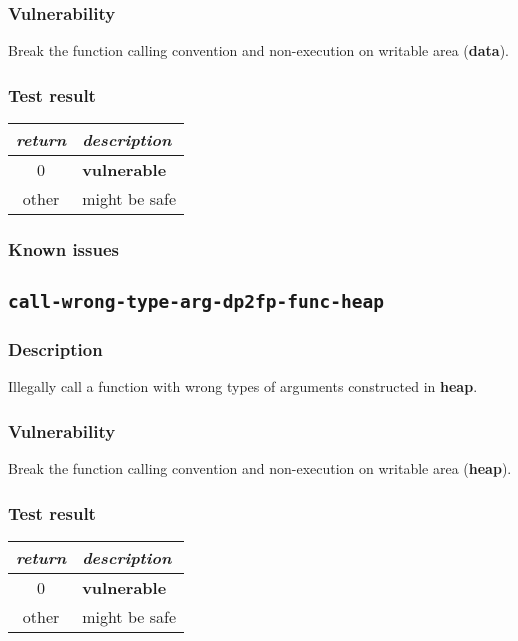 \documentclass[a4paper]{book}
\begin{document}
\subsubsection{Vulnerability}
Break the function calling convention and non-execution on writable area (\textbf{data}).

\subsubsection{Test result}
\begin{tabular}{cl}
  \toprule
  \emph{return}  & \emph{description} \\
  \midrule
  0              & \textbf{vulnerable} \\
  other          & might be safe \\
  \bottomrule
\end{tabular}

\subsubsection{Known issues}

\newpage
\subsection{\texttt{call-wrong-type-arg-dp2fp-func-heap}}\label{test-call-wrong-type-arg-dp2fp-func-heap}

\subsubsection{Description}
Illegally call a function with wrong types of arguments constructed in \textbf{heap}.

\subsubsection{Vulnerability}
Break the function calling convention and non-execution on writable area (\textbf{heap}).

\subsubsection{Test result}
\begin{tabular}{cl}
  \toprule
  \emph{return}  & \emph{description} \\
  \midrule
  0              & \textbf{vulnerable} \\
  other          & might be safe \\
  \bottomrule
\end{tabular}
\end{document}
